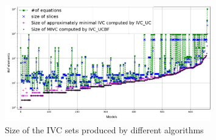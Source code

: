\begin{figure}
  \centering
  \includegraphics[width=0.8\textwidth]{figs/min.jpg}
  \vspace{-0.2in}
  \caption{Size of the IVC sets produced by different algorithms}
 \label{fig:size}
\end{figure}




%


